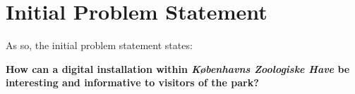 \section*{Initial Problem Statement}\label{sec:ips}
As so, the initial problem statement states: 

\textbf{How can a digital installation within \textit{Københavns Zoologiske Have} be interesting and informative to visitors of the park?}\   










